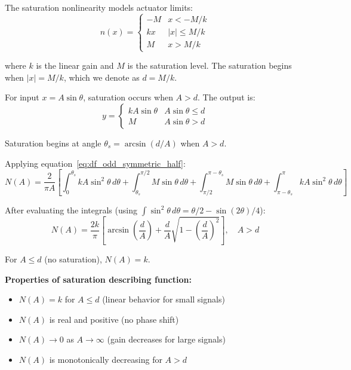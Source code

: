 The saturation nonlinearity models actuator limits:
\begin{equation}
n(x) = \begin{cases}
-M & x < -M/k \\
kx & |x| \leq M/k \\
M & x > M/k
\end{cases}
\label{eq:saturation_def}
\end{equation}

where $k$ is the linear gain and $M$ is the saturation level. The saturation begins when $|x| = M/k$, which we denote as $d = M/k$.

For input $x = A\sin\theta$, saturation occurs when $A > d$. The output is:
\begin{equation}
y = \begin{cases}
kA\sin\theta & A\sin\theta \leq d \\
M & A\sin\theta > d
\end{cases}
\end{equation}

Saturation begins at angle $\theta_s = \arcsin(d/A)$ when $A > d$.

Applying equation~\eqref{eq:df_odd_symmetric_half}:
\begin{equation}
N(A) = \frac{2}{\pi A} \left[ \int_0^{\theta_s} kA\sin^2\theta \, d\theta + \int_{\theta_s}^{\pi/2} M\sin\theta \, d\theta + \int_{\pi/2}^{\pi - \theta_s} M\sin\theta \, d\theta + \int_{\pi-\theta_s}^{\pi} kA\sin^2\theta \, d\theta \right]
\end{equation}

After evaluating the integrals (using $\int \sin^2\theta \, d\theta = \theta/2 - \sin(2\theta)/4$):
\begin{equation}
\boxed{N(A) = \frac{2k}{\pi}\left[\arcsin\left(\frac{d}{A}\right) + \frac{d}{A}\sqrt{1 - \left(\frac{d}{A}\right)^2}\right], \quad A > d}
\label{eq:df_saturation}
\end{equation}

For $A \leq d$ (no saturation), $N(A) = k$.

\textbf{Properties of saturation describing function:}
\begin{itemize}
    \item $N(A) = k$ for $A \leq d$ (linear behavior for small signals)
    \item $N(A)$ is real and positive (no phase shift)
    \item $N(A) \to 0$ as $A \to \infty$ (gain decreases for large signals)
    \item $N(A)$ is monotonically decreasing for $A > d$
\end{itemize}

